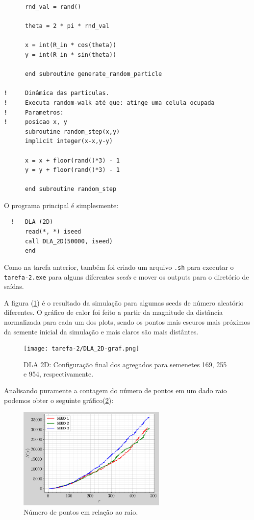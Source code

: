 \documentclass[a4paper, 11pt]{tufte-handout}
\begin{document}
\begin{verbatim}
      rnd_val = rand()

      theta = 2 * pi * rnd_val

      x = int(R_in * cos(theta))
      y = int(R_in * sin(theta))

      end subroutine generate_random_particle

!     Dinâmica das particulas.
!     Executa random-walk até que: atinge uma celula ocupada
!     Parametros:
!     posicao x, y
      subroutine random_step(x,y)
      implicit integer(x-x,y-y)

      x = x + floor(rand()*3) - 1
      y = y + floor(rand()*3) - 1

      end subroutine random_step
\end{verbatim}


O programa principal é simplesmente:

\begin{verbatim}
  !   DLA (2D)
      read(*, *) iseed
      call DLA_2D(50000, iseed)
      end 
\end{verbatim}
Como na tarefa anterior, também foi criado um arquivo \verb|.sh| para executar o \verb|tarefa-2.exe|
para alguns diferentes \emph{seeds} e mover os outputs para o diretório de saídas.

\clearpage


A figura (\ref{fig:dla_2d}) é o resultado da simulação para algumas seeds de número aleatório
diferentes. O gráfico de calor foi feito a partir da magnitude da distância normalizada para cada um
dos plots, sendo os pontos mais escuros mais próximos da semente inicial da simulação e mais claros
são mais distântes.

\begin{figure}[h!]
  \centering
  \texttt{[image: tarefa-2/DLA\_2D-graf.png]}
  \caption{DLA 2D: Configuração final dos agregados para semenetes 169, 255 e 954, respectivamente.}
  \label{fig:dla_2d}
\end{figure}


Analisando puramente a contagem do número de pontos em um dado raio podemos obter o seguinte
gráfico(\ref{fig:n_r_fractal}): 

\begin{figure}[h!]
  \centering
  \includegraphics[width=0.65\textwidth]{tarefa-2/tarefa2-graf-pontos-raio.png}
  \caption{Número de pontos em relação ao raio.}
  \label{fig:n_r_fractal}
\end{figure}
\end{document}
